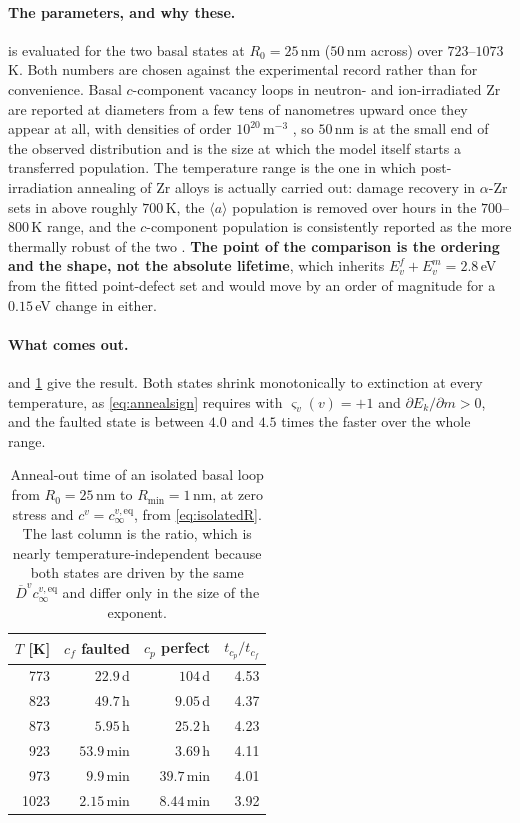 \documentclass{article}
\newcommand{\aloop}{\ensuremath{\langle a\rangle}}
\begin{document}
\paragraph{The parameters, and why these.}  is evaluated for
the two basal states at $R_0=25\,$nm ($50\,$nm across) over $723$--$1073\,$K.
Both numbers are chosen against the experimental record rather than for
convenience. Basal $c$-component vacancy loops in neutron- and ion-irradiated Zr
are reported at diameters from a few tens of nanometres upward once they appear
at all, with densities of order $10^{20}\,$m$^{-3}$
\citep{griffiths1988review,holt1986c,tournadre2012experimental}, so $50\,$nm is
at the small end of the observed distribution and is the size at which the model
itself starts a transferred population. The temperature range is the one in which
post-irradiation annealing of Zr alloys is actually carried out: damage recovery
in $\alpha$-Zr sets in above roughly $700\,$K, the \aloop{} population is removed
over hours in the $700$--$800\,$K range, and the $c$-component population is
consistently reported as the more thermally robust of the two
\citep{griffiths1988review,ribis2010experimental,northwood1979characterization}.
\textbf{The point of the comparison is the ordering and the shape, not the
absolute lifetime}, which inherits $E^f_v+E^m_v=2.8\,$eV from the fitted
point-defect set and would move by an order of magnitude for a $0.15\,$eV change
in either.

\paragraph{What comes out.}  and
\cref{tab:anneal-lifetime} give the result. Both states shrink monotonically to
extinction at every temperature, as \cref{eq:annealsign} requires with
$\varsigma_v(v)=+1$ and $\partial E_k/\partial m>0$, and the faulted state is
between $4.0$ and $4.5$ times the faster over the whole range.

\begin{table}[htbp]
\centering
\caption{Anneal-out time of an isolated basal loop from $R_0=25\,$nm to
$R_{\min}=1\,$nm, at zero stress and $c^v=c^{v,\mathrm{eq}}_\infty$, from
\cref{eq:isolatedR}. The last column is the ratio, which is nearly
temperature-independent because both states are driven by the same
$\overline D^{v}c^{v,\mathrm{eq}}_\infty$ and differ only in the size of the
exponent.}
\label{tab:anneal-lifetime}
\begin{tabular}{@{}r r r r@{}}
\toprule
$T$ [K] & $c_f$ faulted & $c_p$ perfect & $t_{c_p}/t_{c_f}$\\
\midrule
773  & $22.9\,$d   & $104\,$d    & 4.53\\
823  & $49.7\,$h   & $9.05\,$d   & 4.37\\
873  & $5.95\,$h   & $25.2\,$h   & 4.23\\
923  & $53.9\,$min & $3.69\,$h   & 4.11\\
973  & $9.9\,$min  & $39.7\,$min & 4.01\\
1023 & $2.15\,$min & $8.44\,$min & 3.92\\
\bottomrule
\end{tabular}
\end{table}
\end{document}
